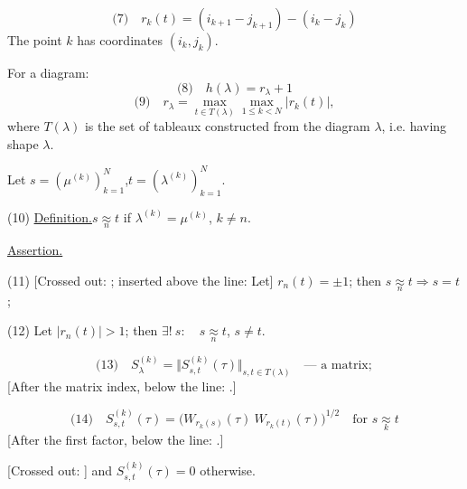 \begin{equation*}
\text{(7)}\quad r_k(t)=(i_{k+1}-j_{k+1})-(i_k-j_k)
\end{equation*}
The point $k$ has coordinates $(i_k,j_k)$.

For a diagram:
\begin{equation*}
\text{(8)}\quad h(\lambda)=r_\lambda+1
\end{equation*}
\begin{equation*}
\text{(9)}\quad r_\lambda=\max_{t\in T(\lambda)}\max_{1\leq k<N}|r_k(t)|,
\end{equation*}
where $T(\lambda)$ is the set of tableaux constructed from the diagram $\lambda$, i.e.
having shape $\lambda$.

Let $s=(\mu^{(k)})_{k=1}^{N}$,\quad $t=(\lambda^{(k)})_{k=1}^{N}$.

(10) \underline{Definition.}\quad $s\underset{n}{\approx}t$ if $\lambda^{(k)}=\mu^{(k)}$, $k\ne n$.

\underline{Assertion.}

(11) [Crossed out: ;
inserted above the line: Let]
$r_n(t)=\pm1$; then $s\underset{n}{\approx}t\Rightarrow s=t$;

(12) Let $|r_n(t)|>1$; then $\exists!\ s:\quad s\underset{n}{\approx}t$, $s\ne t$.

\begin{equation*}
\text{(13)}\quad S_\lambda^{(k)}=\Vert S_{s,t}^{(k)}(\tau)\Vert_{s,t\in T(\lambda)}
\quad\text{--- a matrix};
\end{equation*}
[After the matrix index, below the line:
.]

\begin{equation*}
\text{(14)}\quad
S_{s,t}^{(k)}(\tau)=\bigl(W_{r_k(s)}(\tau)\ W_{r_k(t)}(\tau)\bigr)^{1/2}
\quad\text{for }s\underset{k}{\approx}t
\end{equation*}
[After the first factor, below the line:
.]

[Crossed out: ]
and $S_{s,t}^{(k)}(\tau)=0$ otherwise.

